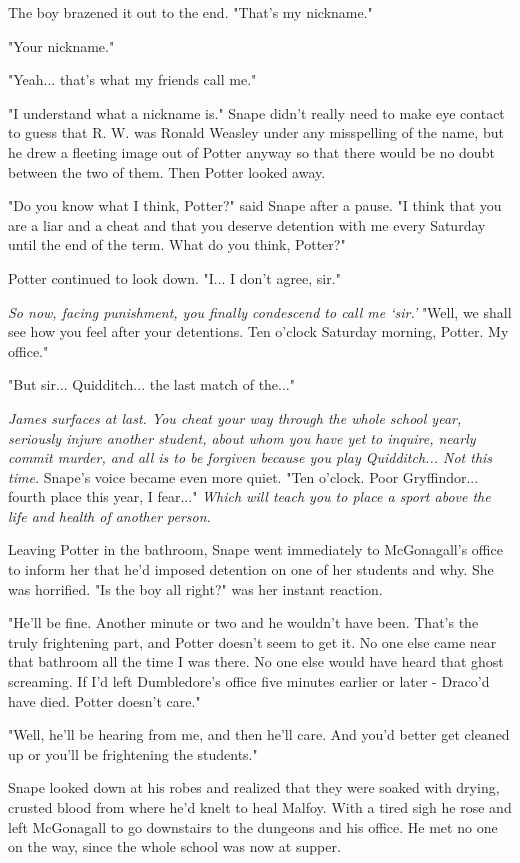 The boy brazened it out to the end. "That's my nickname."

"Your nickname."

"Yeah... that's what my friends call me."

"I understand what a nickname is." Snape didn't really need to make eye contact to guess that R. W. was Ronald Weasley under any misspelling of the name, but he drew a fleeting image out of Potter anyway so that there would be no doubt between the two of them. Then Potter looked away.

"Do you know what I think, Potter?" said Snape after a pause. "I think that you are a liar and a cheat and that you deserve detention with me every Saturday until the end of the term. What do you think, Potter?"

Potter continued to look down. "I... I don't agree, sir."

\emph{So now, facing punishment, you finally condescend to call me `sir.'} "Well, we shall see how you feel after your detentions. Ten o'clock Saturday morning, Potter. My office."

"But sir... Quidditch... the last match of the..."

\emph{James surfaces at last. You cheat your way through the whole school year, seriously injure another student, about whom you have yet to inquire, nearly commit murder, and all is to be forgiven because you play Quidditch... Not this time.} Snape's voice became even more quiet. "Ten o'clock. Poor Gryffindor... fourth place this year, I fear..." \emph{Which will teach you to place a sport above the life and health of another person.}

Leaving Potter in the bathroom, Snape went immediately to McGonagall's office to inform her that he'd imposed detention on one of her students and why. She was horrified. "Is the boy all right?" was her instant reaction.

"He'll be fine. Another minute or two and he wouldn't have been. That's the truly frightening part, and Potter doesn't seem to get it. No one else came near that bathroom all the time I was there. No one else would have heard that ghost screaming. If I'd left Dumbledore's office five minutes earlier or later - Draco'd have died. Potter doesn't care."

"Well, he'll be hearing from me, and then he'll care. And you'd better get cleaned up or you'll be frightening the students."

Snape looked down at his robes and realized that they were soaked with drying, crusted blood from where he'd knelt to heal Malfoy. With a tired sigh he rose and left McGonagall to go downstairs to the dungeons and his office. He met no one on the way, since the whole school was now at supper.

